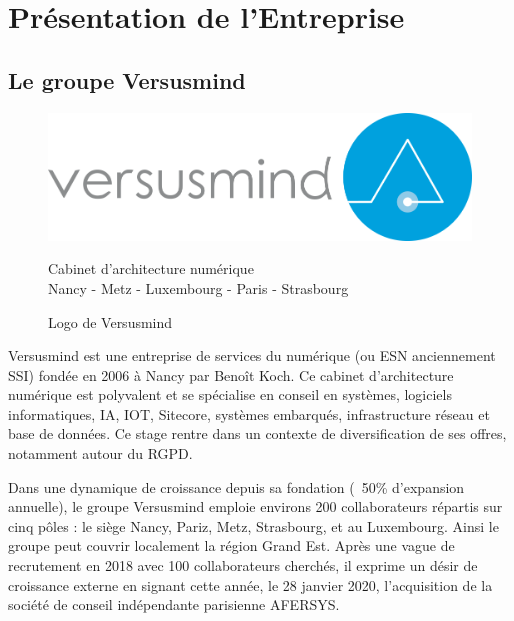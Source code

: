 \documentclass[12pt, a4paper]{report}
\newcommand\tab[1][1cm]{\hspace*{#1}}
\begin{document}
\chapter{Présentation de l’Entreprise}
\section{Le groupe Versusmind}
\begin{figure}[H]
    \centering
    \includegraphics[width=.8\textwidth]{versusmind.png}
    \begin{center}
        \color{gray} Cabinet d'architecture numérique\\
        \scriptsize\color{gray}Nancy \hyp{} Metz \hyp{} Luxembourg \hyp{} Paris \hyp{} Strasbourg
    \end{center}
    \caption{Logo de Versusmind}
\end{figure}
\tab{}Versusmind est une entreprise de services du numérique (ou ESN anciennement SSI) fondée en 2006
à Nancy par Benoît Koch. Ce cabinet d’architecture numérique est polyvalent et se spécialise en conseil
en systèmes, logiciels informatiques, IA, IOT, Sitecore, systèmes embarqués, infrastructure réseau et
base de données. Ce stage rentre dans un contexte de diversification de ses offres, notamment autour
du RGPD.\newline

Dans une dynamique de croissance depuis sa fondation (~50\% d’expansion annuelle), le groupe
Versusmind emploie environs 200 collaborateurs répartis sur cinq pôles : le siège Nancy, Pariz, Metz,
Strasbourg, et au Luxembourg. Ainsi le groupe peut couvrir localement la région Grand Est. Après une
vague de recrutement en 2018 avec 100 collaborateurs cherchés, il exprime un désir de croissance
externe en signant cette année, le 28 janvier 2020, l’acquisition de la société de conseil indépendante
parisienne AFERSYS.
\end{document}
